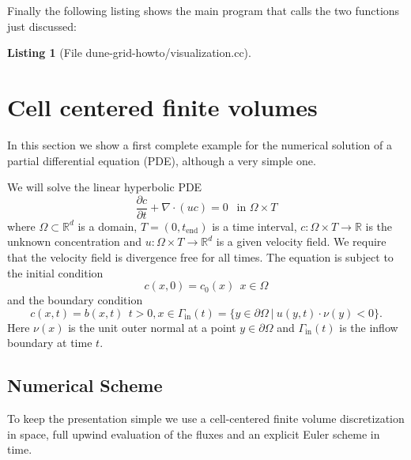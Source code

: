 \documentclass[11pt,a4paper,headinclude,footinclude,DIV16,normalheadings]{scrreprt}
\newtheorem{lst}{Listing}
\begin{document}
Finally the following listing shows the main program that calls the
two functions just discussed:

\begin{lst}[File dune-grid-howto/visualization.cc] \mbox{}
\nopagebreak

\end{lst}

\section{Cell centered finite volumes}
\label{Sec:CellCenteredFV}

In this section we show a first complete example for the numerical
solution of a partial differential equation (PDE), although a very simple
one.

We will solve the linear hyperbolic PDE
\begin{equation}
\frac{\partial c}{\partial t} + \nabla\cdot (uc) = 0 \ \ \text{ in
  $\Omega\times T$}
\label{Eq:TransportEquation}
\end{equation}
where $\Omega\subset\mathbb{R}^d$ is a domain, $T=(0,t_{\text{end}})$
is a time interval,
$c:\Omega\times T\to\mathbb{R}$ is the unknown concentration and
$u:\Omega\times T\to\mathbb{R}^d$ is a given velocity field. We
require that the velocity field is divergence free for all times.
The equation is subject to the initial condition
\begin{equation}
c(x,0) = c_0(x) \ \ x\in\Omega
\end{equation}
and the boundary condition
\begin{equation}
c(x,t) = b(x,t) \ \ t>0, x\in\Gamma_{\text{in}}(t)=\{y\in\partial\Omega\
|\ u(y,t)\cdot\nu(y)<0\}. 
\end{equation}
Here $\nu(x)$ is the unit outer normal at a point $y\in\partial\Omega$
and $\Gamma_{\text{in}}(t)$ is the inflow boundary at time $t$.

\subsection{Numerical Scheme}

To keep the presentation simple we use a cell-centered finite volume
discretization in space, full upwind evaluation of the fluxes and an
explicit Euler scheme in time.
\end{document}
